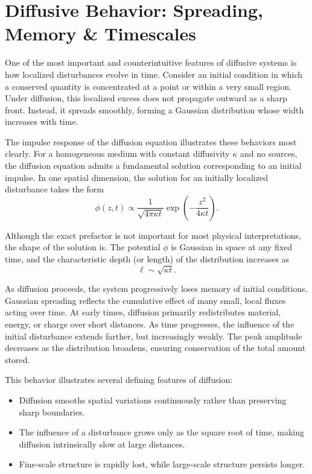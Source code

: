 \section{Diffusive Behavior: Spreading, Memory \& Timescales}

One of the most important and counterintuitive features of diffusive systems is how localized disturbances evolve in time. Consider an initial condition in which a conserved quantity is concentrated at a point or within a very small region.  Under diffusion, this localized excess does not propagate outward as a sharp front. Instead, it spreads smoothly, forming a Gaussian distribution whose width increases with time.

The impulse response of the diffusion equation illustrates these behaviors most clearly.
For a homogeneous medium with constant diffusivity $\kappa$ and no sources, the diffusion equation admits a fundamental solution corresponding to an initial impulse. In one spatial dimension, the solution for an initially localized disturbance takes the form
\[
    \phi(z,t) \propto \frac{1}{\sqrt{4\pi\kappa t}}
    \exp\!\left(-\frac{z^2}{4\kappa t}\right).
\]

Although the exact prefactor is not important for most physical interpretations, the shape of the solution is. The potential $\phi$ is Gaussian in space at any fixed time, and the characteristic depth (or length) of the distribution increases as
\[
    \ell \sim \sqrt{\kappa t}.
\]

As diffusion proceeds, the system progressively loses memory of initial conditions.  Gaussian spreading reflects the cumulative effect of many small, local fluxes acting over time. At early times, diffusion primarily redistributes material, energy, or charge over short distances. As time progresses, the influence of the initial disturbance extends farther, but increasingly weakly. The peak amplitude decreases as the distribution broadens, ensuring conservation of the total amount stored.

This behavior illustrates several defining features of diffusion:
\begin{itemize}
    \item Diffusion smooths spatial variations continuously rather than preserving
    sharp boundaries.
    \item The influence of a disturbance grows only as the square root of time,
    making diffusion intrinsically slow at large distances.
    \item Fine-scale structure is rapidly lost, while large-scale structure
    persists longer.
\end{itemize}

